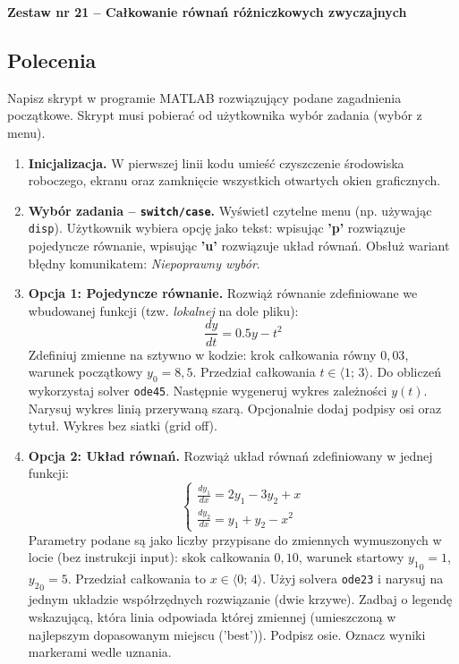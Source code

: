 \documentclass[a4paper,11pt]{article}
\begin{document}
\clearpage
\begin{center}
  {\large\bfseries Zestaw nr 21 \quad -- \quad Całkowanie równań różniczkowych zwyczajnych}
\end{center}
\hrulefill
\vspace{0.4cm}

\subsection*{Polecenia}

Napisz skrypt w programie MATLAB rozwiązujący podane zagadnienia początkowe. Skrypt musi pobierać od użytkownika wybór zadania (wybór z menu).

\begin{enumerate}[leftmargin=*, label=\textbf{\arabic*.}, itemsep=2pt]

  \item \textbf{Inicjalizacja.}
    W pierwszej linii kodu umieść czyszczenie środowiska roboczego, ekranu oraz zamknięcie wszystkich otwartych okien graficznych.

  \item \textbf{Wybór zadania -- \texttt{switch/case}.}
    Wyświetl czytelne menu (np. używając \texttt{disp}). Użytkownik wybiera opcję jako tekst: wpisując \textbf{'p'} rozwiązuje pojedyncze równanie, wpisując \textbf{'u'} rozwiązuje układ równań. Obsłuż wariant błędny komunikatem: \textit{Niepoprawny wybór}.

  \item \textbf{Opcja 1: Pojedyncze równanie.}
    Rozwiąż równanie zdefiniowane we wbudowanej funkcji (tzw. \textit{lokalnej} na dole pliku):
    \[ \frac{dy}{dt} = 0.5y - t^2 \]
    Zdefiniuj zmienne na sztywno w kodzie: krok całkowania równy $0{,}03$, warunek początkowy $y_0 = 8{,}5$. Przedział całkowania $t \in \langle 1;\,3 \rangle$.
    Do obliczeń wykorzystaj solver \texttt{ode45}. Następnie wygeneruj wykres zależności $y(t)$. Narysuj wykres linią przerywaną szarą. Opcjonalnie dodaj podpisy osi oraz tytuł. Wykres bez siatki (grid off).

  \item \textbf{Opcja 2: Układ równań.}
    Rozwiąż układ równań zdefiniowany w jednej funkcji:\\[-0.5em]
    \[
    \begin{cases}
      \frac{dy_1}{dx} = 2y_1 - 3y_2 + x \\
      \frac{dy_2}{dx} = y_1 + y_2 - x^2
    \end{cases}
    \]
    Parametry podane są jako liczby przypisane do zmiennych wymuszonych w locie (bez instrukcji input): skok całkowania $0{,}10$, warunek startowy $ {y_1}_{0} = 1 $, $ {y_2}_{0} = 5 $. Przedział całkowania to $x \in \langle 0;\,4 \rangle$.
    Użyj solvera \texttt{ode23} i narysuj na jednym układzie współrzędnych rozwiązanie (dwie krzywe). Zadbaj o legendę wskazującą, która linia odpowiada której zmiennej (umieszczoną w najlepszym dopasowanym miejscu ('best')). Podpisz osie. Oznacz wyniki markerami wedle uznania.

\end{enumerate}
\end{document}
